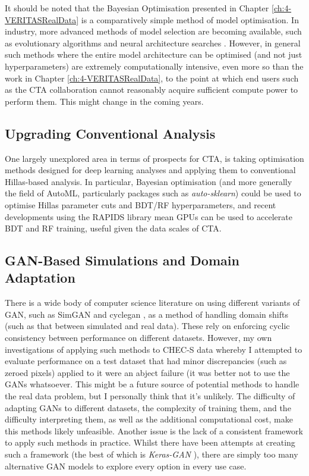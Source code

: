 It should be noted that the Bayesian Optimisation presented in Chapter \ref{ch:4-VERITASRealData} is a comparatively simple method of model optimisation. In industry, more advanced methods of model selection are becoming available, such as evolutionary algorithms \cite{evodeep} and neural architecture searches \cite{neural}. However, in general such methods where the entire model architecture can be optimised (and not just hyperparameters) are extremely computationally intensive, even more so than the work in Chapter \ref{ch:4-VERITASRealData}, to the point at which end users such as the CTA collaboration cannot reasonably acquire sufficient compute power to perform them. This might change in the coming years.

\subsection{Upgrading Conventional Analysis}
One largely unexplored area in terms of prospects for CTA, is taking optimisation methods designed for deep learning analyses and applying them to conventional Hillas-based analysis. In particular, Bayesian optimisation (and more generally the field of AutoML, particularly packages such as \textit{auto-sklearn}\cite{autosklearn}) could be used to optimise Hillas parameter cuts and BDT/RF hyperparameters, and recent developments using the RAPIDS \cite{rapids} library mean GPUs can be used to accelerate BDT and RF training, useful given the data scales of CTA.


\subsection{GAN-Based Simulations and Domain Adaptation}
There is a wide body of computer science literature on using different variants of GAN, such as SimGAN \cite{simgan} and cyclegan \cite{cyclegan}, as a method of handling domain shifts (such as that between simulated and real data). These rely on enforcing cyclic consistency between performance on different datasets. However, my own investigations of applying such methods to CHEC-S data whereby I attempted to evaluate performance on a test dataset that had minor discrepancies (such as zeroed pixels) applied to it were an abject failure (it was better not to use the GANs whatsoever. This might be a future source of potential methods to handle the real data problem, but I personally think that it's unlikely. The difficulty of adapting GANs to different datasets, the complexity of training them, and the difficulty interpreting them, as well as the additional computational cost, make this methods likely unfeasible. Another issue is the lack of a consistent framework to apply such methods in practice. Whilst there have been attempts at creating such a framework (the best of which is \textit{Keras-GAN} \cite{kerasgan}), there are simply too many alternative GAN models to explore every option in every use case. 


